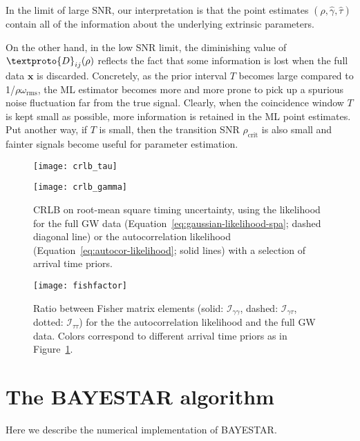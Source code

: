 \documentclass{iopart}
\begin{document}
In the limit of large SNR, our interpretation is that the point estimates $(\hat\rho, \hat\gamma, \hat\tau)$ contain all of the information about the underlying extrinsic parameters.

On the other hand, in the low SNR limit, the diminishing value of $\textproto{D}_{ij}(\rho)$ reflects the fact that some information is lost when the full data $\mathbf{x}$ is discarded. Concretely, as the prior interval $T$ becomes large compared to 1/$\rho\omega_\mathrm{rms}$, the ML estimator becomes more and more prone to pick up a spurious noise fluctuation far from the true signal. Clearly, when the coincidence window $T$ is kept small as possible, more information is retained in the ML point estimates. Put another way, if $T$ is small, then the transition SNR $\rho_\mathrm{crit}$ is also small and fainter signals become useful for parameter estimation.

\begin{figure}
    \begin{center}
        \texttt{[image: crlb\_tau]}

        \texttt{[image: crlb\_gamma]}
    \end{center}
    \caption{\label{fig:crlb-tau}\ac{CRLB} on root\nobreakdashes-mean square timing uncertainty, using the likelihood for the full GW data (Equation~\ref{eq:gaussian-likelihood-spa}; dashed diagonal line) or the autocorrelation likelihood (Equation~\ref{eq:autocor-likelihood}; solid lines) with a selection of arrival time priors.}
\end{figure}

\begin{figure}
    \begin{center}
        \texttt{[image: fishfactor]}
    \end{center}
    \caption{\label{fig:fishfactor}Ratio between Fisher matrix elements (solid: $\mathcal{I}_{\gamma\gamma}$, dashed: $\mathcal{I}_{\gamma\tau}$, dotted: $\mathcal{I}_{\tau\tau}$) for the the autocorrelation likelihood and the full GW data. Colors correspond to different arrival time priors as in Figure~\ref{fig:crlb-tau}.}
\end{figure}

\section{The \ac{BAYESTAR} algorithm}

Here we describe the numerical implementation of \ac{BAYESTAR}.
\end{document}
